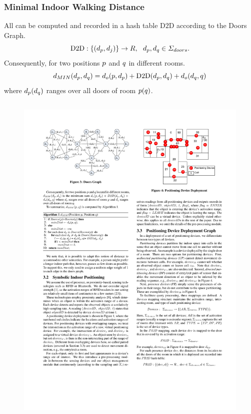 \begin{frame}
\frametitle{Minimal Indoor Walking Distance}

All  can be computed and recorded in a hash table $\mathrm{D2D}$ according to the Doors Graph.
\pause
\begin{equation}
  \mathrm{D2D}: \mathnormal{ \{ (d_p, d_j) \} \rightarrow R, ~~d_p, d_q \in \Sigma_{doors} }.
\end{equation}
\pause
Consequently, for two positions $\mathnormal{p}$ and $\mathnormal{q}$ in different rooms.
\pause
\begin{equation}
  \mathnormal{d_{MIN}(d_p, d_q) = d_o(p, d_p) + \mathrm{D2D}(d_p, d_q) + d_o(d_q, q)}
\end{equation}
where $\mathnormal{d_p(d_q)}$ ranges over all doors of room $\mathnormal{p(q)}$.
\pause
\begin{columns}[c]

    \begin{figure}[tb]
      \includegraphics[width=\columnwidth]{figures/2-3/2-3-3.pdf}
    \end{figure}


\end{columns}

\end{frame}
